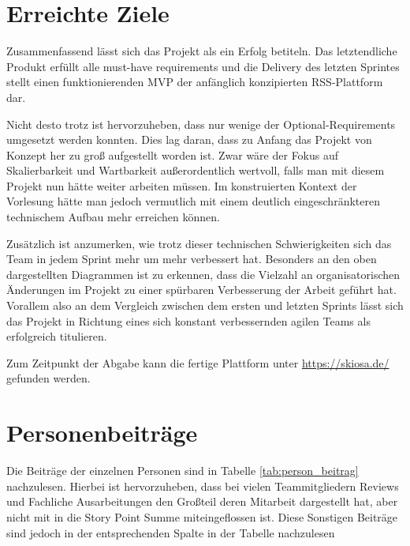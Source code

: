 \section{Erreichte Ziele}
Zusammenfassend lässt sich das Projekt als ein Erfolg betiteln.
Das letztendliche Produkt erfüllt alle must-have requirements und die Delivery des letzten Sprintes stellt einen funktionierenden \ac{MVP} der anfänglich konzipierten RSS-Plattform dar.

Nicht desto trotz ist hervorzuheben, dass nur wenige der Optional-Requirements umgesetzt werden konnten.
Dies lag daran, dass zu Anfang das Projekt von Konzept her zu groß aufgestellt worden ist.
Zwar wäre der Fokus auf Skalierbarkeit und Wartbarkeit außerordentlich wertvoll, falls man mit diesem Projekt nun hätte weiter arbeiten müssen.
Im konstruierten Kontext der Vorlesung hätte man jedoch vermutlich mit einem deutlich eingeschränkteren technischem Aufbau mehr erreichen können.

Zusätzlich ist anzumerken, wie trotz dieser technischen Schwierigkeiten sich das Team in jedem Sprint mehr um mehr verbessert hat.
Besonders an den oben dargestellten Diagrammen ist zu erkennen, dass die Vielzahl an organisatorischen Änderungen im Projekt zu einer spürbaren Verbesserung der Arbeit geführt hat.
Vorallem also an dem Vergleich zwischen dem ersten und letzten Sprints lässt sich das Projekt in Richtung eines sich konstant verbessernden agilen Teams als erfolgreich titulieren.

Zum Zeitpunkt der Abgabe kann die fertige Plattform unter \url{https://skiosa.de/} gefunden werden.

\section{Personenbeiträge}
Die Beiträge der einzelnen Personen sind in Tabelle \ref{tab:person_beitrag} nachzulesen.
Hierbei ist hervorzuheben, dass bei vielen Teammitgliedern Reviews und Fachliche Ausarbeitungen den Großteil deren Mitarbeit dargestellt hat, aber nicht mit in die Story Point Summe miteingeflossen ist. 
Diese Sonstigen Beiträge sind jedoch in der entsprechenden Spalte in der Tabelle nachzulesen

